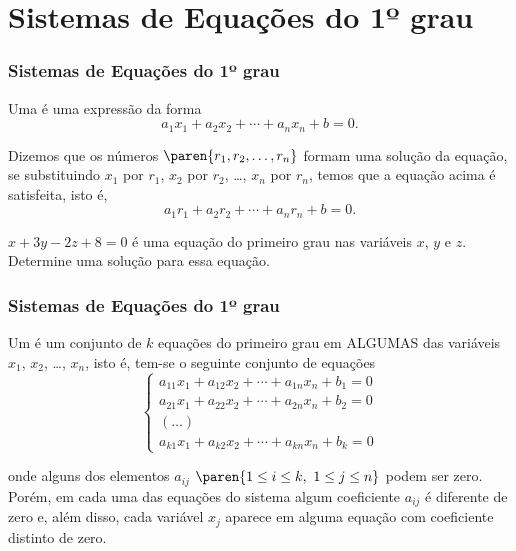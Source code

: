 \section{Sistemas de Equações do 1º grau}
\begin{frame}
    \frametitle{Sistemas de Equações do 1º grau} 
    
    
    \begin{definicao}
    Uma  é uma expressão da forma
    $$a_1x_1 + a_2x_2 + \cdots + a_nx_n +b = 0.$$
    \end{definicao}\pause

    Dizemos que os números $\paren{r_1, r_2, \dots , r_n}$ formam uma solução da equação, se substituindo $x_1$ por $r_1$, $x_2$ por $r_2$, \dots , $x_n$ por $r_n$, temos que a equação acima é satisfeita, isto é, $$a_1r_1 + a_2r_2 + \cdots + a_nr_n +b = 0.$$ \pause

    \begin{exemplo}
        $x + 3y - 2z +8 = 0$ é uma equação do primeiro grau nas variáveis $x$, $y$ e $z$.    Determine uma solução para essa equação.
    \end{exemplo}


\end{frame}
    
    
    

\begin{frame}
    \frametitle{Sistemas de Equações do 1º grau} 

    \begin{definicao}
        Um    é um conjunto de $k$ equações do primeiro grau em ALGUMAS das variáveis $x_1$, $x_2$, \dots , $x_n$, isto é, tem-se o seguinte conjunto de equações
        $$\left\{
        \begin{array}{llll}
        a_{11}x_1 + a_{12}x_2 + \cdots + a_{1n}x_n +b_1 = 0 \\
        a_{21}x_1 + a_{22}x_2 + \cdots + a_{2n}x_n +b_2 = 0 \\
        (\dots) \\
        a_{k1}x_1 + a_{k2}x_2 + \cdots + a_{kn}x_n +b_k = 0 
        \end{array} \right.$$

        onde alguns dos elementos $a_{ij}$ $\paren{1 \leq i \leq k, \ 1 \leq j \leq n}$ podem ser zero. Porém, em cada uma das equações do sistema algum coeficiente $a_{ij}$ é diferente de zero e, além disso, cada variável $x_j$ aparece em alguma equação com coeficiente distinto de zero.
    \end{definicao}


\end{frame}
        
